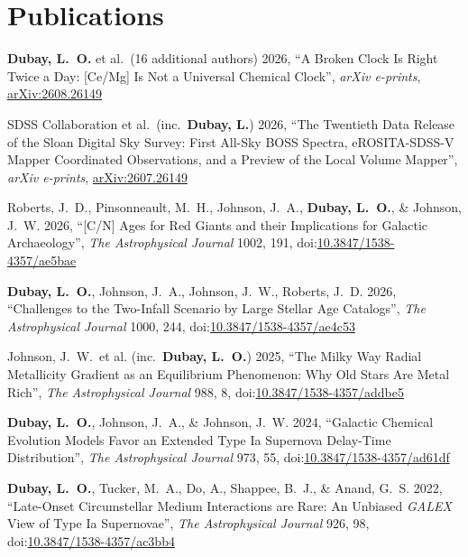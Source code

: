 \section*{Publications}



\noindent
{\bf Dubay, L.\ O.} et al.\ (16 additional authors) 2026, ``A Broken Clock Is Right Twice a Day: [Ce/Mg] Is Not a Universal Chemical Clock'', {\it arXiv e-prints}, \href{https://arxiv.org/abs/2608.26261}{arXiv:2608.26149}

\vspace{12pt}
\noindent
SDSS Collaboration et al.\ (inc.\ {\bf Dubay, L.}) 2026, ``The Twentieth Data Release of the Sloan Digital Sky Survey: First All-Sky BOSS Spectra, eROSITA-SDSS-V Mapper Coordinated Observations, and a Preview of the Local Volume Mapper'', {\it arXiv e-prints}, \href{https://arxiv.org/abs/2607.26149}{arXiv:2607.26149}

\vspace{12pt}
\noindent
Roberts, J.\ D., Pinsonneault, M.\ H., Johnson, J.\ A., {\bf Dubay, L.\ O.}, \& Johnson, J.\ W. 2026, ``[C/N] Ages for Red Giants and their Implications for Galactic Archaeology'', {\it The Astrophysical Journal} 1002, 191, doi:\href{https://doi.org/10.3847/1538-4357/ae5bae}{10.3847/1538-4357/ae5bae}

\vspace{12pt}
\noindent
{\bf Dubay, L.\ O.}, Johnson, J.\ A., Johnson, J.\ W., Roberts, J.\ D. 2026, ``Challenges to the Two-Infall Scenario by Large Stellar Age Catalogs'', {\it The Astrophysical Journal} 1000, 244, doi:\href{https://doi.org/10.3847/1538-4357/ae4c53}{10.3847/1538-4357/ae4c53}


\vspace{12pt}
\noindent
Johnson, J.\ W.\ et al. (inc.\ {\bf Dubay, L.\ O.}) 2025, ``The Milky Way Radial Metallicity Gradient as an Equilibrium Phenomenon: Why Old Stars Are Metal Rich'', {\it The Astrophysical Journal} 988, 8, doi:\href{https://iopscience.iop.org/article/10.3847/1538-4357/addbe5}{10.3847/1538-4357/addbe5}

\vspace{12pt}
\noindent
{\bf Dubay, L.\ O.}, Johnson, J.\ A., \& Johnson, J.\ W. 2024, ``Galactic Chemical Evolution Models Favor an Extended Type Ia Supernova Delay-Time Distribution'', {\it The Astrophysical Journal} 973, 55, doi:\href{https://doi.org/10.3847/1538-4357/ad61df}{10.3847/1538-4357/ad61df}

\vspace{12pt}
\noindent
{\bf Dubay, L.\ O.}, Tucker, M.\ A., Do, A., Shappee, B.\ J., \& Anand, G.\ S. 2022, ``Late-Onset Circumstellar Medium Interactions are Rare: An Unbiased \textit{GALEX} View of Type Ia Supernovae'', {\it The Astrophysical Journal} 926, 98, doi:\href{https://doi.org/10.3847/1538-4357/ac3bb4}{10.3847/1538-4357/ac3bb4}